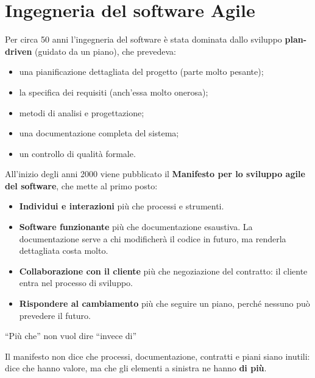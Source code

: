 \chapter{Ingegneria del software Agile}\label{ch-02}


Per circa 50 anni l'ingegneria del software è stata dominata dallo
sviluppo \textbf{plan-driven} (guidato da un piano), che prevedeva:

\begin{itemize}
\tightlist
\item
  una pianificazione dettagliata del progetto (parte molto pesante);
\item
  la specifica dei requisiti (anch'essa molto onerosa);
\item
  metodi di analisi e progettazione;
\item
  una documentazione completa del sistema;
\item
  un controllo di qualità formale.
\end{itemize}

All'inizio degli anni 2000 viene pubblicato il \textbf{Manifesto per lo
sviluppo agile del software}, che mette al primo posto:

\begin{itemize}
\tightlist
\item
  \textbf{Individui e interazioni} più che processi e strumenti.
\item
  \textbf{Software funzionante} più che documentazione esaustiva. La
  documentazione serve a chi modificherà il codice in futuro, ma
  renderla dettagliata costa molto.
\item
  \textbf{Collaborazione con il cliente} più che negoziazione del
  contratto: il cliente entra nel processo di sviluppo.
\item
  \textbf{Rispondere al cambiamento} più che seguire un piano, perché
  nessuno può prevedere il futuro.
\end{itemize}

\begin{boxnote}{``Più che'' non vuol dire ``invece di''}

Il manifesto non dice che processi, documentazione, contratti e piani
siano inutili: dice che hanno valore, ma che gli elementi a sinistra ne
hanno \textbf{di più}.

\end{boxnote}

